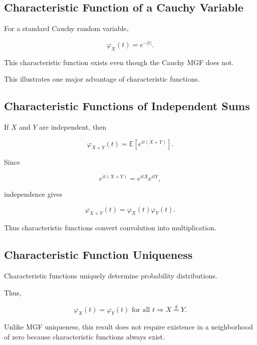 \subsection{Characteristic Function of a Cauchy Variable}
\label{subsec:cf-cauchy}

For a standard Cauchy random variable,

\[
\boxed{
\varphi_X(t)
=
e^{-|t|}.
}
\]

This characteristic function exists even though the Cauchy MGF does
not.

This illustrates one major advantage of characteristic functions.

\subsection{Characteristic Functions of Independent Sums}
\label{subsec:cf-independent-sums}

If \(X\) and \(Y\) are independent, then

\[
\varphi_{X+Y}(t)
=
\mathbb{E}
[
e^{it(X+Y)}
].
\]

Since

\[
e^{it(X+Y)}
=
e^{itX}e^{itY},
\]

independence gives

\[
\boxed{
\varphi_{X+Y}(t)
=
\varphi_X(t)\varphi_Y(t).
}
\]

Thus characteristic functions convert convolution into multiplication.

\subsection{Characteristic Function Uniqueness}
\label{subsec:cf-uniqueness}

Characteristic functions uniquely determine probability distributions.

Thus,

\[
\boxed{
\varphi_X(t)
=
\varphi_Y(t)
\text{ for all }t
\Longrightarrow
X\overset{d}{=}Y.
}
\]

Unlike MGF uniqueness, this result does not require existence in a
neighborhood of zero because characteristic functions always exist.

